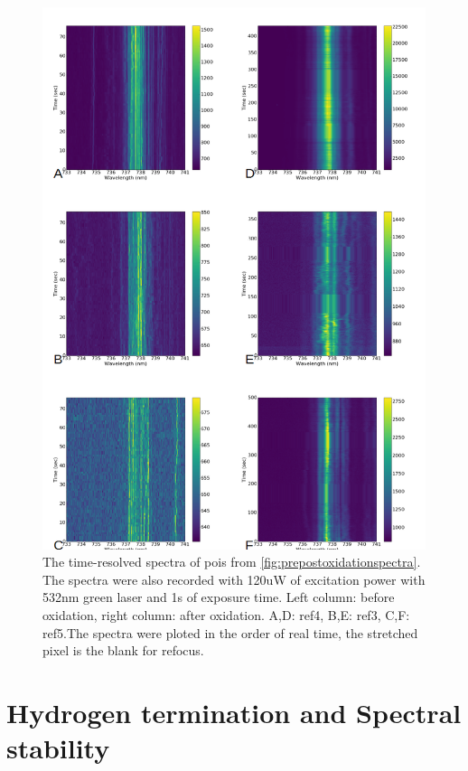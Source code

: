 \begin{figure}[h]
\centering
\includegraphics[width=1\linewidth]{Figures/pic/prepostoxidationtimeresolvespectra}
\caption{The time-resolved spectra of pois from \ref{fig:prepostoxidationspectra}. The spectra were also recorded with 120uW of excitation power with 532nm green laser and 1s of exposure time. Left column: before oxidation, right column: after oxidation. A,D: ref4, B,E: ref3, C,F: ref5.The spectra were ploted in the order of real time, the stretched pixel is the blank for refocus.}
\label{fig:prepostoxidationtimeresolvespectra}
\end{figure}


\section{Hydrogen termination and Spectral stability}


